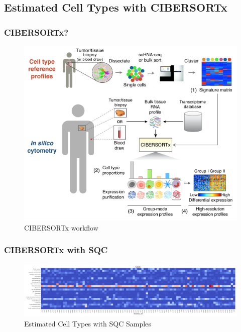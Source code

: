 \documentclass{beamer}
\begin{document}
    \subsection{Estimated Cell Types with CIBERSORTx}
    \begin{frame}
        \frametitle{CIBERSORTx?}

        \begin{figure}
            \includegraphics[width=0.6 \linewidth]{figures/Workflow/CIBERSORTx.png}
            \caption{CIBERSORTx workflow \protect\cite{cibersort1}}
        \end{figure}
    \end{frame}

    \begin{frame}
        \frametitle{CIBERSORTx with SQC}

        \begin{figure}
            \includegraphics[width=\linewidth]{figures/CIBERSORTx/SQC.Bowtie2.CibersortX.pdf}
            \caption{Estimated Cell Types with SQC Samples}
        \end{figure}
    \end{frame}
\end{document}
